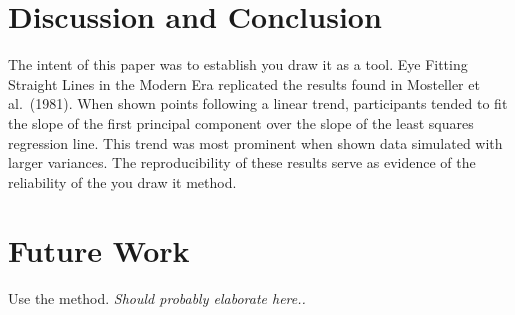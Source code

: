 \documentclass[12pt]{article}
\begin{document}
\hypertarget{discussion-and-conclusion}{%
\section{Discussion and Conclusion}\label{discussion-and-conclusion}}

The intent of this paper was to establish you draw it as a tool. Eye
Fitting Straight Lines in the Modern Era replicated the results found in
Mosteller et al.~(1981). When shown points following a linear trend,
participants tended to fit the slope of the first principal component
over the slope of the least squares regression line. This trend was most
prominent when shown data simulated with larger variances. The
reproducibility of these results serve as evidence of the reliability of
the you draw it method.

\hypertarget{future-work}{%
\section{Future Work}\label{future-work}}

Use the method. \emph{Should probably elaborate here..}



\end{document}
